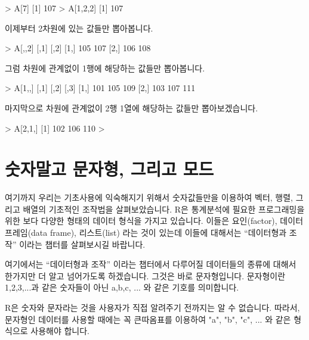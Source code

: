 \begin{Schunk}
\begin{Soutput}
> A[7]
[1] 107
> A[1,2,2]
[1] 107
\end{Soutput}
\end{Schunk}


이제부터 2차원에 있는 값들만 뽑아봅니다. 

\begin{Schunk}
\begin{Soutput}
> A[,,2]
     [,1] [,2]
[1,]  105  107
[2,]  106  108
\end{Soutput}
\end{Schunk}


그럼 차원에 관계없이 1행에 해당하는 값들만 뽑아봅니다.
\begin{Schunk}
\begin{Soutput}
> A[1,,]
     [,1] [,2] [,3]
[1,]  101  105  109
[2,]  103  107  111
\end{Soutput}
\end{Schunk}


마지막으로 차원에 관계없이 2행 1열에 해당하는 값들만 뽑아보겠습니다. 

\begin{Schunk}
\begin{Soutput}
> A[2,1,]
[1] 102 106 110
> 
\end{Soutput}
\end{Schunk}


\section{숫자말고 문자형, 그리고 모드}

여기까지 우리는 기초사용에 익숙해지기 위해서 숫자값들만을 이용하여 벡터, 행렬, 그리고 배열의 기초적인 조작법을 살펴보았습니다. 
R은 통계분석에 필요한 프로그래밍을 위한 보다 다양한 형태의 데이터 형식을 가지고 있습니다.
이들은 요인(factor), 데이터 프레임(data frame), 리스트(list) 라는 것이 있는데 이들에 대해서는 ``데이터형과 조작'' 이라는 챕터를 살펴보시길 바랍니다. 

여기에서는 ``데이터형과 조작'' 이라는 챕터에서 다루어질 데이터들의 종류에 대해서 한가지만 더 알고 넘어가도록 하겠습니다.
그것은 바로 문자형입니다. 
문자형이란 1,2,3,...과 같은 숫자들이 아닌 a,b,c, ... 와 같은 기호를 의미합니다.

R은 숫자와 문자라는 것을 사용자가 직접 알려주기 전까지는 알 수 없습니다. 
따라서, 문자형인 데이터를 사용할 때에는 꼭 큰따옴표를 이용하여 "a", "b", "c", ... 와 같은 형식으로 사용해야 합니다. 

